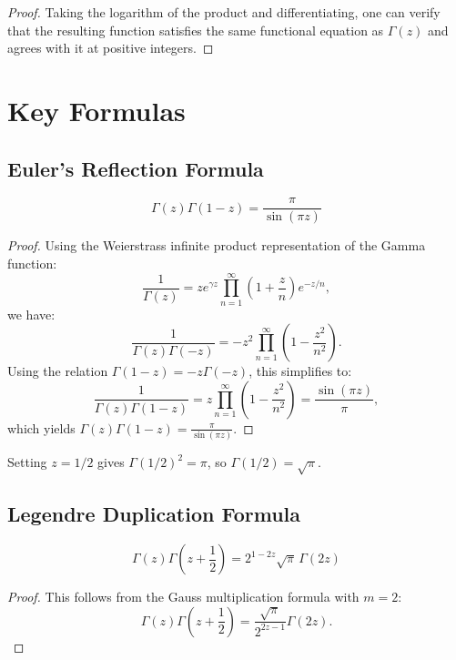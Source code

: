 \begin{proof}
Taking the logarithm of the product and differentiating, one can verify that the resulting function satisfies the same functional equation as $\Gamma(z)$ and agrees with it at positive integers.
\end{proof}

\section{Key Formulas}

\subsection{Euler's Reflection Formula}

\begin{theorem}
\[
\Gamma(z)\Gamma(1-z) = \frac{\pi}{\sin(\pi z)}
\]
\end{theorem}

\begin{proof}
Using the Weierstrass infinite product representation of the Gamma function:
\[
\frac{1}{\Gamma(z)} = z e^{\gamma z} \prod_{n=1}^\infty \left(1 + \frac{z}{n}\right) e^{-z/n},
\]
we have:
\[
\frac{1}{\Gamma(z)\Gamma(-z)} = -z^2 \prod_{n=1}^\infty \left(1 - \frac{z^2}{n^2}\right).
\]
Using the relation $\Gamma(1-z) = -z\Gamma(-z)$, this simplifies to:
\[
\frac{1}{\Gamma(z)\Gamma(1-z)} = z \prod_{n=1}^\infty \left(1 - \frac{z^2}{n^2}\right) = \frac{\sin(\pi z)}{\pi},
\]
which yields $\Gamma(z)\Gamma(1-z) = \frac{\pi}{\sin(\pi z)}$.
\end{proof}

\begin{corollary}
Setting $z = 1/2$ gives $\Gamma(1/2)^2 = \pi$, so $\Gamma(1/2) = \sqrt{\pi}$.
\end{corollary}

\subsection{Legendre Duplication Formula}

\begin{theorem}
\[
\Gamma(z)\Gamma\left(z+\frac{1}{2}\right) = 2^{1-2z}\sqrt{\pi}\,\Gamma(2z)
\]
\end{theorem}

\begin{proof}
This follows from the Gauss multiplication formula with $m = 2$:
\[
\Gamma(z)\Gamma\left(z + \frac{1}{2}\right) = \frac{\sqrt{\pi}}{2^{2z-1}} \Gamma(2z).
\]
\end{proof}

